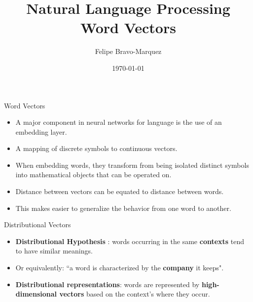 \documentclass[handout]{beamer}
\title{Natural Language Processing \\ Word Vectors}
\author[Felipe Bravo Márquez]{\footnotesize
 \textcolor[rgb]{0.00,0.00,1.00}{Felipe Bravo-Marquez}}
\date{\today}
\begin{document}
\begin{frame}
\titlepage


\end{frame}


\begin{frame}{Word Vectors}
\begin{scriptsize}
\begin{itemize}
\item A major component in neural networks for language is the use of an embedding
layer.
\item A mapping of discrete symbols to continuous vectors.
\item  When embedding words, they transform from being isolated distinct symbols into mathematical
objects that can be operated on. 
\item Distance between vectors can be equated to distance between words. 
\item This makes easier to generalize the behavior from one word to another.
\end{itemize}
\end{scriptsize}
\end{frame}


\begin{frame}{Distributional Vectors}
\begin{scriptsize}
\begin{itemize}
\item \textbf{Distributional Hypothesis} \cite{harris1954}: words occurring in the same \textbf{contexts} tend to have similar meanings.
\item Or equivalently: ``a word is characterized by the \textbf{company} it keeps".
\item \textbf{Distributional representations}: words are represented by \textbf{high-dimensional vectors} based on the context's where they occur. 

\end{itemize}
\end{scriptsize}
\end{frame}
\end{document}
